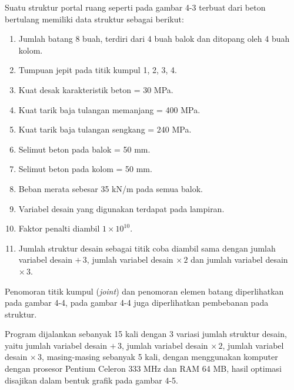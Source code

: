 Suatu struktur portal ruang seperti pada gambar 4-3 terbuat dari beton
bertulang memiliki data struktur sebagai berikut:
\begin{enumerate}[label=\arabic*.]
\item Jumlah batang 8 buah, terdiri dari 4 buah balok dan ditopang oleh 4
      buah kolom.
\item Tumpuan jepit pada titik kumpul 1, 2, 3, 4.
\item Kuat desak karakteristik beton = 30 MPa.
\item Kuat tarik baja tulangan memanjang = 400 MPa.
\item Kuat tarik baja tulangan sengkang = 240 MPa.
\item Selimut beton pada balok = 50 mm.
\item Selimut beton pada kolom = 50 mm.
\item Beban merata sebesar 35 kN/m pada semua balok.
\item Variabel desain yang digunakan terdapat pada lampiran.
\item Faktor penalti diambil $1\times10^{10}$.
\item Jumlah struktur desain sebagai titik coba diambil sama dengan
      jumlah variabel desain $+\,3$, jumlah variabel desain $\times\,2$
      dan jumlah variabel desain $\times\,3$.
\end{enumerate}


Penomoran titik kumpul (\textit{joint}) dan penomoran elemen batang
diperlihatkan pada gambar 4-4, pada gambar 4-4 juga diperlihatkan
pembebanan pada struktur.


Program dijalankan sebanyak 15 kali dengan 3 variasi jumlah struktur
desain, yaitu jumlah variabel desain $+\,3$, jumlah variabel desain
$\times\,2$, jumlah variabel desain $\times\,3$, masing-masing sebanyak
5 kali, dengan menggunakan komputer dengan prosesor Pentium Celeron
333 MHz dan RAM 64 MB, hasil optimasi disajikan dalam bentuk grafik pada
gambar 4-5.


